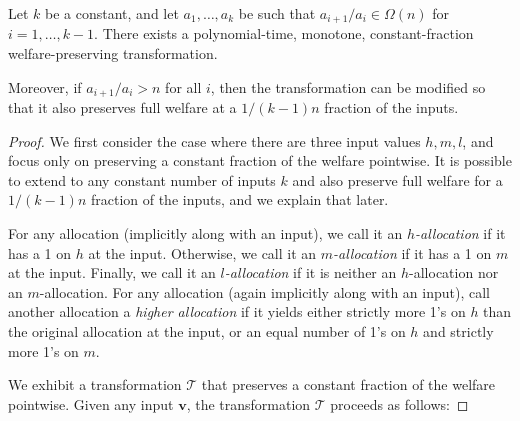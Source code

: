 \documentclass[runningheads,a4paper]{llncs}
\begin{document}
\begin{theorem}
\label{thm:algomorebetter}
Let $k$ be a constant, and let $a_1,\dots,a_k$ be such that $a_{i+1}/a_i\in\Omega(n)$ for $i=1,\ldots,k-1$. There exists a polynomial-time, monotone, constant-fraction welfare-preserving transformation. 

Moreover, if $a_{i+1}/a_i>n$ for all $i$, then the transformation can be modified so that it also preserves full welfare at a $1/(k-1)n$ fraction of the inputs.
\end{theorem}

\begin{proof}
We first consider the case where there are three input values $h,m,l$, and focus only on preserving a constant fraction of the welfare pointwise. It is possible to extend to any constant number of inputs $k$ and also preserve full welfare for a $1/(k-1)n$ fraction of the inputs, and we explain that later.

For any allocation (implicitly along with an input), we call it an \textit{$h$-allocation} if it has a 1 on $h$ at the input. Otherwise, we call it an \textit{$m$-allocation} if it has a 1 on $m$ at the input. Finally, we call it an \textit{$l$-allocation} if it is neither an $h$-allocation nor an $m$-allocation. For any allocation (again implicitly along with an input), call another allocation a \textit{higher allocation} if it yields either strictly more 1's on $h$ than the original allocation at the input, or an equal number of 1's on $h$ and strictly more 1's on $m$.

We exhibit a transformation $\mathcal{T}$ that preserves a constant fraction of the welfare pointwise. Given any input $\textbf{v}$, the transformation $\mathcal{T}$ proceeds as follows:


\end{proof}
\end{document}
